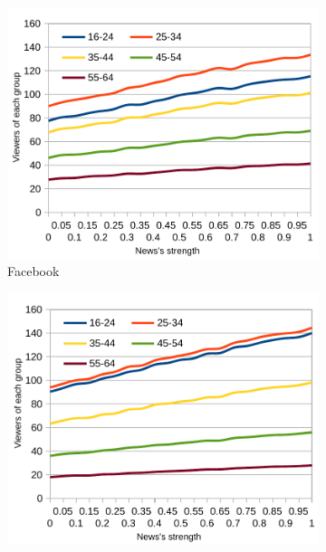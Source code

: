 \vspace*{-15pt}
\begin{figure}[!ht]
  \begin{subfigure}[l]{0.32\textwidth}
    \begin{center}
      \includegraphics[width=1\textwidth]{charts/second-test-fb_1.pdf}
    \end{center}
    \vspace*{-10pt}
    \caption{Facebook}
    \label{img:result_test_2_fb_1}
  \end{subfigure}  
  \begin{subfigure}[c]{0.32\textwidth}
    \begin{center}
      \includegraphics[width=1\textwidth]{charts/second-test-tw_1.pdf}

\end{center}
\end{subfigure}
\end{figure}
